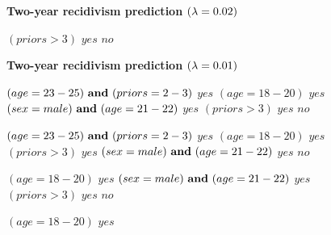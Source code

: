 %
\begin{figure}[h!]
\textbf{Two-year recidivism prediction $({\lambda} = 0.02)$}
\vspace{1mm}
\begin{algorithmic}
\State \bif $(priors > 3)$ \bthen $yes$ 
\State \belse $no$
\end{algorithmic}
\vspace{5mm}
\textbf{Two-year recidivism prediction $({\lambda} = 0.01)$}
\vspace{1mm}
\begin{algorithmic}
\State \bif $(age = 23-25) {\bf ~and~} (priors = 2-3)$ \bthen $yes$ 
\State \belif $(age = 18-20)$ \bthen $yes$
\State \belif $(sex = male) {\bf ~and~} (age = 21-22)$ \bthen $yes$
\State \belif $(priors > 3)$ \bthen $yes$
\State \belse $no$
\end{algorithmic}
\vspace{1mm}
\begin{algorithmic}
\State \bif $(age = 23-25) {\bf ~and~} (priors = 2-3)$ \bthen $yes$ 
\State \belif $(age = 18-20)$ \bthen $yes$
\State \belif $(priors > 3)$ \bthen $yes$
\State \belif $(sex = male) {\bf ~and~} (age = 21-22)$ \bthen $yes$
\State \belse $no$
\end{algorithmic}
\vspace{1mm}
\begin{algorithmic}
\State \bif $(age = 18-20)$ \bthen $yes$ 
\State \belif $(sex = male) {\bf ~and~} (age = 21-22)$ \bthen $yes$
\State \belif $(priors > 3)$ \bthen $yes$
\State \belse $no$
\end{algorithmic}
\vspace{1mm}
\begin{algorithmic}
\State \bif $(age = 18-20)$ \bthen $yes$ 

\end{algorithmic}
\end{figure}

